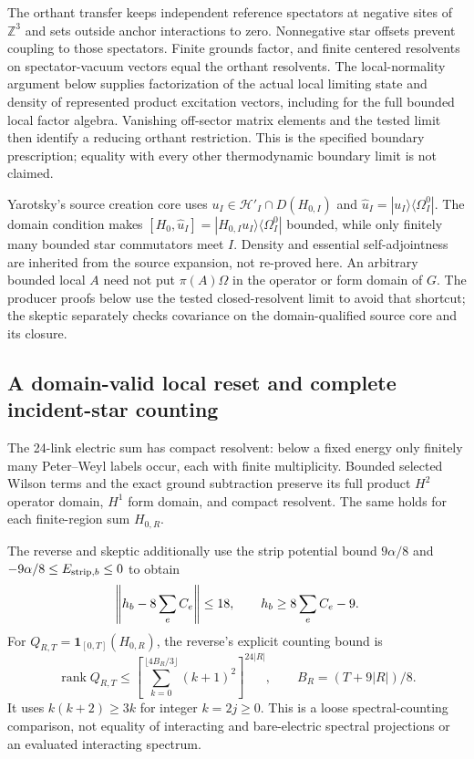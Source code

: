 The orthant transfer keeps independent reference spectators at negative sites of $\mathbb Z^3$ and sets outside anchor interactions to zero. Nonnegative star offsets prevent coupling to those spectators. Finite grounds factor, and finite centered resolvents on spectator-vacuum vectors equal the orthant resolvents. The local-normality argument below supplies factorization of the actual local limiting state and density of represented product excitation vectors, including for the full bounded local factor algebra. Vanishing off-sector matrix elements and the tested limit then identify a reducing orthant restriction. This is the specified boundary prescription; equality with every other thermodynamic boundary limit is not claimed.

Yarotsky's source creation core uses $u_I\in\mathcal H'_I\cap D(H_{0,I})$ and $\widehat u_I=|u_I\rangle\langle\Omega_I^0|$. The domain condition makes $[H_0,\widehat u_I]=|H_{0,I}u_I\rangle\langle\Omega_I^0|$ bounded, while only finitely many bounded star commutators meet $I$. Density and essential self-adjointness are inherited from the source expansion, not re-proved here. An arbitrary bounded local $A$ need not put $\pi(A)\Omega$ in the operator or form domain of $G$. The producer proofs below use the tested closed-resolvent limit to avoid that shortcut; the skeptic separately checks covariance on the domain-qualified source core and its closure.

\subsection{A domain-valid local reset and complete incident-star counting}
The 24-link electric sum has compact resolvent: below a fixed energy only finitely many Peter--Weyl labels occur, each with finite multiplicity. Bounded selected Wilson terms and the exact ground subtraction preserve its full product $H^2$ operator domain, $H^1$ form domain, and compact resolvent. The same holds for each finite-region sum $H_{0,R}$.

The reverse and skeptic additionally use the strip potential bound $9\alpha/8$ and $-9\alpha/8\le E_{{\rm strip},b}\le0$ to obtain
\begin{equation}
 \left\lVert h_b-8\sum_eC_e\right\rVert\le18,\qquad
 h_b\ge8\sum_eC_e-9.
\end{equation}
For $Q_{R,T}=\mathbf1_{[0,T]}(H_{0,R})$, the reverse's explicit counting bound is
\begin{equation}
 \operatorname{rank}Q_{R,T}
 \le\left[\sum_{k=0}^{\lfloor4B_R/3\rfloor}(k+1)^2\right]^{24|R|},
 \qquad B_R=(T+9|R|)/8.
 \label{eq:aj1-rank}
\end{equation}
It uses $k(k+2)\ge3k$ for integer $k=2j\ge0$. This is a loose spectral-counting comparison, not equality of interacting and bare-electric spectral projections or an evaluated interacting spectrum.


